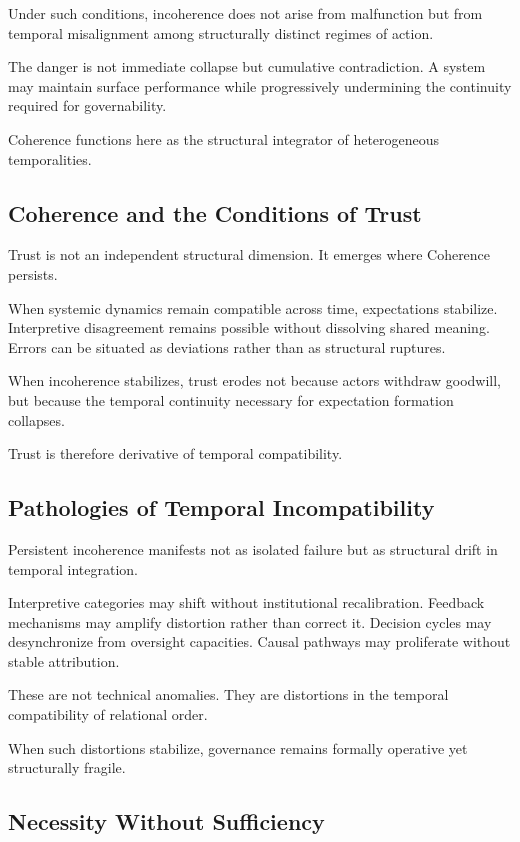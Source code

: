 \documentclass[12pt]{article}
\begin{document}
Under such conditions, incoherence does not arise from malfunction but from temporal misalignment among structurally distinct regimes of action.

The danger is not immediate collapse but cumulative contradiction. A system may maintain surface performance while progressively undermining the continuity required for governability.

Coherence functions here as the structural integrator of heterogeneous temporalities.

\subsection{Coherence and the Conditions of Trust}


Trust is not an independent structural dimension. It emerges where Coherence persists.

When systemic dynamics remain compatible across time, expectations stabilize. Interpretive disagreement remains possible without dissolving shared meaning. Errors can be situated as deviations rather than as structural ruptures.

When incoherence stabilizes, trust erodes not because actors withdraw goodwill, but because the temporal continuity necessary for expectation formation collapses.

Trust is therefore derivative of temporal compatibility.

\subsection{Pathologies of Temporal Incompatibility}


Persistent incoherence manifests not as isolated failure but as structural drift in temporal integration.

Interpretive categories may shift without institutional recalibration. Feedback mechanisms may amplify distortion rather than correct it. Decision cycles may desynchronize from oversight capacities. Causal pathways may proliferate without stable attribution.

These are not technical anomalies. They are distortions in the temporal compatibility of relational order.

When such distortions stabilize, governance remains formally operative yet structurally fragile.

\subsection{Necessity Without Sufficiency}
\end{document}
